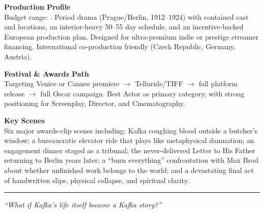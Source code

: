 \documentclass[11pt,letterpaper]{article}
\begin{document}
\vspace{4pt}

\textbf{Production Profile}\\
Budget range: \filmbudgetrange. Period drama (Prague/Berlin, 1912--1924) with contained cast and locations, an interior-heavy 50--55 day schedule, and an incentive-backed European production plan. Designed for ultra-premium indie or prestige streamer financing. International co-production friendly (Czech Republic, Germany, Austria).

\vspace{4pt}

\textbf{Festival \& Awards Path}\\
Targeting Venice or Cannes premiere $\rightarrow$ Telluride/TIFF $\rightarrow$ fall platform release $\rightarrow$ full Oscar campaign. Best Actor as primary category, with strong positioning for Screenplay, Director, and Cinematography.

\vspace{4pt}

\textbf{Key Scenes}\\
Six major awards-clip scenes including: Kafka coughing blood outside a butcher's window; a bureaucratic elevator ride that plays like metaphysical damnation; an engagement dinner staged as a tribunal; the never-delivered Letter to His Father returning to Berlin years later; a ``burn everything'' confrontation with Max Brod about whether unfinished work belongs to the world; and a devastating final act of handwritten slips, physical collapse, and spiritual clarity.

\vspace{4pt}
\textcolor{sectionrule}{\rule{\textwidth}{0.5pt}}
\vspace{2pt}
\begin{center}
{\small\color{kafkalight}\textit{``What if Kafka's life itself became a Kafka story?''}}
\end{center}
\end{document}
